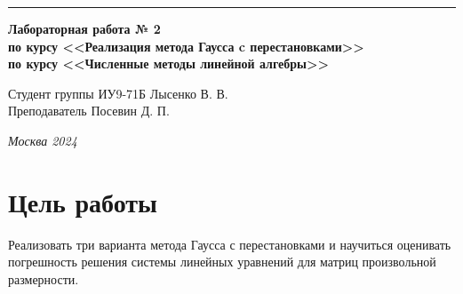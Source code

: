 \documentclass[a4paper, 14pt]{extarticle}
\begin{document}
\begin{titlepage}
\vspace*{-16pt}
\hspace{30pt}\rule{0.866\textwidth}{0.4pt}
  
\vspace{11em}

\begin{center}
\Large {\bf Лабораторная работа № 2} \\ 
\large {\bf по курсу <<Реализация метода Гаусса c перестановками>>} \\ 
\large {\bf по курсу <<Численные методы линейной алгебры>>} \\ 
\end{center}\normalsize

\vspace{8em}


\begin{flushright}
  {Студент группы ИУ9-71Б Лысенко В. В.\hspace*{15pt} \\
  \vspace{2ex}
  Преподаватель Посевин Д. П.\hspace*{15pt}}
\end{flushright}

\bigskip

\vfill
 

\begin{center}
\textsl{Москва 2024}
\end{center}
\end{titlepage}

\renewcommand{\ttdefault}{pcr}

\setlength{\tabcolsep}{3pt}
\newpage
\setcounter{page}{2}

\section{Цель работы}\label{Sect::task}
\par
\renewcommand{\labelenumii}{\arabic{enumi}.\arabic{enumii}.}
Реализовать три варианта метода Гаусса с перестановками и научиться оценивать погрешность решения системы линейных уравнений для матриц произвольной размерности.
\end{document}
